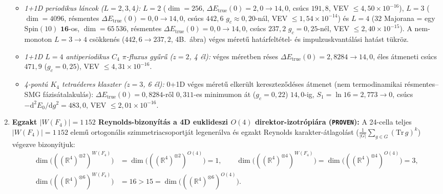 \documentclass[11pt,a4paper]{article}
\begin{document}
\begin{enumerate}
    \begin{itemize}
        \item \emph{1+1D periodikus láncok ($L=2, 3, 4$):} $L=2$ ($\dim=256$, $\Delta E_{\mathrm{true}}(0)=2{,}0 \to 14{,}0$, csúcs $191{,}8$, VEV $\le 4{,}50\times 10^{-16}$), $L=3$ ($\dim=4096$, résmentes $\Delta E_{\mathrm{true}}(0)=0{,}0 \to 14{,}0$, csúcs $442{,}6$ $g_c\approx 0{,}20$-nál, VEV $\le 1{,}54\times 10^{-14}$) és $L=4$ ($32$ Majorana = egy $\mathrm{Spin}(10)$ $\mathbf{16}$-os, $\dim=65\,536$, résmentes $\Delta E_{\mathrm{true}}(0)=0{,}0 \to 14{,}0$, csúcs $237{,}2$ $g_c=0{,}25$-nél, VEV $\le 2{,}40\times 10^{-15}$). A nem-monoton $L=3\to 4$ csökkenés ($442{,}6 \to 237{,}2$, 4B.~ábra) véges méretű határfeltétel- és impulzuskvantálási hatást tükröz.
        \item \emph{1+1D $L=4$ antiperiodikus $C_4$ $\pi$-fluxus gyűrű ($z=2$, 4 él):} véges méretben réses $\Delta E_{\mathrm{true}}(0) = 2{,}8284 \to 14{,}0$, éles átmeneti csúcs $471{,}9$ ($g_c=0{,}25$), VEV $\le 4{,}31\times 10^{-16}$.
        \item \emph{4-pontú $K_4$ tetraéderes klaszter ($z=3$, 6 él):} 0+1D véges méretű elkerült kereszteződéses átmenet (nem termodinamikai résmentes--SMG fázisátalakulás): $\Delta E_{\mathrm{true}}(0) = 0{,}8284$-ről $0{,}311$-es minimumon át ($g_c=0{,}22$) $14{,}0$-ig, $S_1 = \ln 16 = 2{,}773 \to 0$, csúcs $-\mathrm{d}^2 E_0/\mathrm{d}g^2 = 483{,}0$, VEV $\le 2{,}01\times 10^{-16}$.
    \end{itemize}
    \item \textbf{Egzakt $|W(F_4)| = 1\,152$ Reynolds-bizonyítás a 4D euklideszi $O(4)$ direktor-izotrópiára (\texttt{PROVEN}):}
    A 24-cella teljes $|W(F_4)| = 1\,152$ elemű ortogonális szimmetriacsoportját legenerálva és egzakt Reynolds karakter-átlagolást ($\frac{1}{|G|}\sum_{g\in G} (\mathrm{Tr}\,g)^k$) végezve bizonyítjuk:
    \begin{equation}
    \begin{aligned}
        \dim\bigl(((\mathbb{R}^4)^{\otimes 2})^{W(F_4)}\bigr) &= \dim\bigl(((\mathbb{R}^4)^{\otimes 2})^{O(4)}\bigr) = 1, \qquad
        \dim\bigl(((\mathbb{R}^4)^{\otimes 4})^{W(F_4)}\bigr) = \dim\bigl(((\mathbb{R}^4)^{\otimes 4})^{O(4)}\bigr) = 3, \\
        \dim\bigl(((\mathbb{R}^4)^{\otimes 6})^{W(F_4)}\bigr) &= 16 > 15 = \dim\bigl(((\mathbb{R}^4)^{\otimes 6})^{O(4)}\bigr).
    \end{aligned}
        \label{eq:wf4-reynolds-hu}
    \end{equation}

\end{enumerate}
\end{document}
